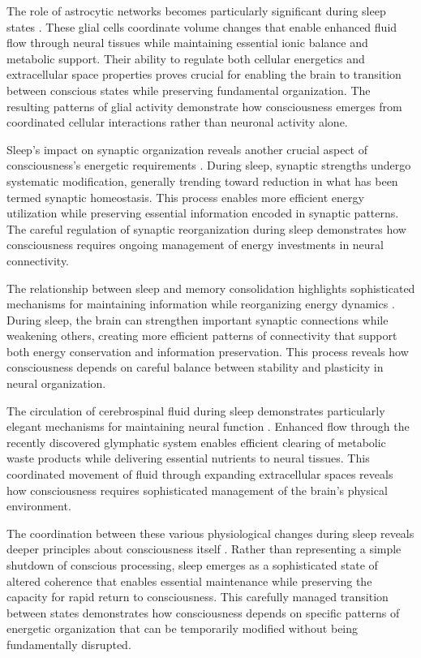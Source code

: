 \begin{refsection}
The role of astrocytic networks becomes particularly significant during sleep states \cite{Krueger2016}. These glial cells coordinate volume changes that enable enhanced fluid flow through neural tissues while maintaining essential ionic balance and metabolic support. Their ability to regulate both cellular energetics and extracellular space properties proves crucial for enabling the brain to transition between conscious states while preserving fundamental organization. The resulting patterns of glial activity demonstrate how consciousness emerges from coordinated cellular interactions rather than neuronal activity alone.

Sleep's impact on synaptic organization reveals another crucial aspect of consciousness's energetic requirements \cite{Cirelli2015}. During sleep, synaptic strengths undergo systematic modification, generally trending toward reduction in what has been termed synaptic homeostasis. This process enables more efficient energy utilization while preserving essential information encoded in synaptic patterns. The careful regulation of synaptic reorganization during sleep demonstrates how consciousness requires ongoing management of energy investments in neural connectivity.

The relationship between sleep and memory consolidation highlights sophisticated mechanisms for maintaining information while reorganizing energy dynamics \cite{Rasch2013}. During sleep, the brain can strengthen important synaptic connections while weakening others, creating more efficient patterns of connectivity that support both energy conservation and information preservation. This process reveals how consciousness depends on careful balance between stability and plasticity in neural organization.

The circulation of cerebrospinal fluid during sleep demonstrates particularly elegant mechanisms for maintaining neural function \cite{Xie2013}. Enhanced flow through the recently discovered glymphatic system enables efficient clearing of metabolic waste products while delivering essential nutrients to neural tissues. This coordinated movement of fluid through expanding extracellular spaces reveals how consciousness requires sophisticated management of the brain's physical environment.

The coordination between these various physiological changes during sleep reveals deeper principles about consciousness itself \cite{Saper2017}. Rather than representing a simple shutdown of conscious processing, sleep emerges as a sophisticated state of altered coherence that enables essential maintenance while preserving the capacity for rapid return to consciousness. This carefully managed transition between states demonstrates how consciousness depends on specific patterns of energetic organization that can be temporarily modified without being fundamentally disrupted.


\end{refsection}
